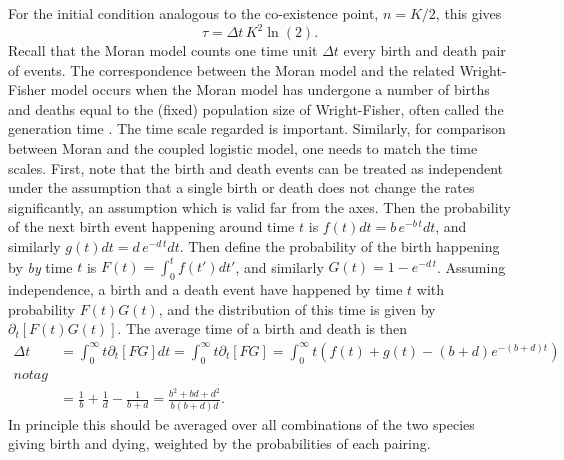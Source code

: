For the initial condition analogous to the co-existence point, $n = K/2$, this gives
\begin{equation*}
\tau = \Delta t\,K^2\ln\left(2\right).
\end{equation*}
Recall that the Moran model counts one time unit $\Delta t$ every birth and death pair of events. 
The correspondence between the Moran model and the related Wright-Fisher model occurs when the Moran model has undergone a number of births and deaths equal to the (fixed) population size of Wright-Fisher, often called the generation time \cite{um}. 
The time scale regarded is important. 
Similarly, for comparison between Moran and the coupled logistic model, one needs to match the time scales. 
First, note that the birth and death events can be treated as independent under the assumption that a single birth or death does not change the rates significantly, an assumption which is valid far from the axes. 
Then the probability of the next birth event happening around time $t$ is $f(t)dt = b\,e^{-b\,t}dt$, and similarly $g(t)dt = d\,e^{-d\,t}dt$. 
Then define the probability of the birth happening by \emph{by} time $t$ is $F(t) = \int_0^t f(t') dt'$, and similarly $G(t) = 1-e^{-d\,t}$. 
Assuming independence, a birth and a death event have happened by time $t$ with probability $F(t)G(t)$, and the distribution of this time is given by $\partial_t[F(t)G(t)]$. 
The average time of a birth and death is then
\begin{align*}
 \Delta t &= \int_{0}^{\infty} t \partial_t[FG] dt = \int_{0}^{\infty} t \partial_t[FG] = \int_{0}^{\infty} t \left(f(t) + g(t) - (b+d)e^{-(b+d)t}\right) \\notag \\
          &= \frac{1}{b} + \frac{1}{d} - \frac{1}{b+d} = \frac{b^2 + b d + d^2}{b (b+d) d}.
\end{align*}
In principle this should be averaged over all combinations of the two species giving birth and dying, weighted by the probabilities of each pairing. 
